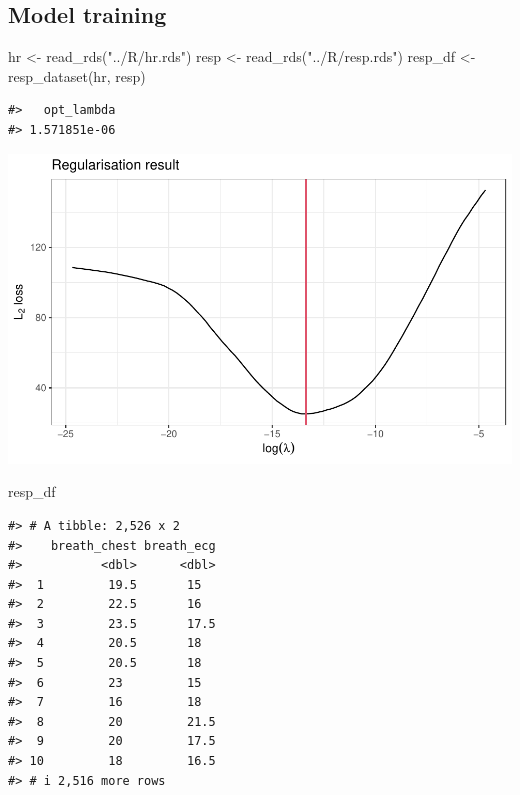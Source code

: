 \documentclass[
]{article}
\newenvironment{Shaded}{\begin{snugshade}}{\end{snugshade}}
\newcommand{\FunctionTok}[1]{\textcolor[rgb]{0.00,0.00,0.00}{#1}}
\newcommand{\NormalTok}[1]{#1}
\newcommand{\OtherTok}[1]{\textcolor[rgb]{0.56,0.35,0.01}{#1}}
\newcommand{\StringTok}[1]{\textcolor[rgb]{0.31,0.60,0.02}{#1}}
\begin{document}
\hypertarget{model-training-1}{%
\subsection{Model training}\label{model-training-1}}

\begin{Shaded}
\begin{Highlighting}[]
\NormalTok{hr }\OtherTok{\textless{}{-}} \FunctionTok{read\_rds}\NormalTok{(}\StringTok{"../R/hr.rds"}\NormalTok{)}
\NormalTok{resp }\OtherTok{\textless{}{-}} \FunctionTok{read\_rds}\NormalTok{(}\StringTok{"../R/resp.rds"}\NormalTok{)}
\NormalTok{resp\_df }\OtherTok{\textless{}{-}} \FunctionTok{resp\_dataset}\NormalTok{(hr, resp)}
\end{Highlighting}
\end{Shaded}

\begin{verbatim}
#>   opt_lambda 
#> 1.571851e-06
\end{verbatim}

\begin{center}\includegraphics{report_files/figure-latex/train-1} \end{center}

\begin{Shaded}
\begin{Highlighting}[]
\NormalTok{resp\_df}
\end{Highlighting}
\end{Shaded}

\begin{verbatim}
#> # A tibble: 2,526 x 2
#>    breath_chest breath_ecg
#>           <dbl>      <dbl>
#>  1         19.5       15  
#>  2         22.5       16  
#>  3         23.5       17.5
#>  4         20.5       18  
#>  5         20.5       18  
#>  6         23         15  
#>  7         16         18  
#>  8         20         21.5
#>  9         20         17.5
#> 10         18         16.5
#> # i 2,516 more rows
\end{verbatim}
\end{document}

